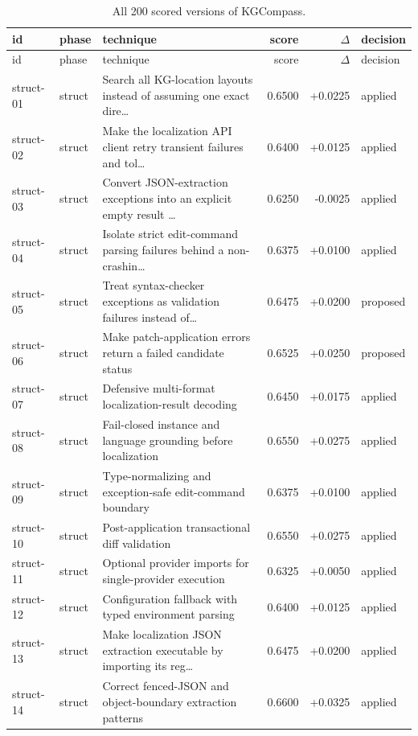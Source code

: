 \begin{center}\scriptsize\begin{longtable}{llp{5.2cm}rrl}
\caption{All 200 scored versions of KGCompass.}\\
\toprule id & phase & technique & score & $\Delta$ & decision \\ \midrule \endfirsthead
\toprule id & phase & technique & score & $\Delta$ & decision \\ \midrule \endhead
struct-01 & struct & Search all KG-location layouts instead of assuming one exact dire\ldots{} & 0.6500 & +0.0225 & applied \\
struct-02 & struct & Make the localization API client retry transient failures and tol\ldots{} & 0.6400 & +0.0125 & applied \\
struct-03 & struct & Convert JSON-extraction exceptions into an explicit empty result \ldots{} & 0.6250 & -0.0025 & applied \\
struct-04 & struct & Isolate strict edit-command parsing failures behind a non-crashin\ldots{} & 0.6375 & +0.0100 & applied \\
struct-05 & struct & Treat syntax-checker exceptions as validation failures instead of\ldots{} & 0.6475 & +0.0200 & proposed \\
struct-06 & struct & Make patch-application errors return a failed candidate status & 0.6525 & +0.0250 & proposed \\
struct-07 & struct & Defensive multi-format localization-result decoding & 0.6450 & +0.0175 & applied \\
struct-08 & struct & Fail-closed instance and language grounding before localization & 0.6550 & +0.0275 & applied \\
struct-09 & struct & Type-normalizing and exception-safe edit-command boundary & 0.6375 & +0.0100 & applied \\
struct-10 & struct & Post-application transactional diff validation & 0.6550 & +0.0275 & applied \\
struct-11 & struct & Optional provider imports for single-provider execution & 0.6325 & +0.0050 & applied \\
struct-12 & struct & Configuration fallback with typed environment parsing & 0.6400 & +0.0125 & applied \\
struct-13 & struct & Make localization JSON extraction executable by importing its reg\ldots{} & 0.6475 & +0.0200 & applied \\
struct-14 & struct & Correct fenced-JSON and object-boundary extraction patterns & 0.6600 & +0.0325 & applied \\

\end{longtable}
\end{center}
